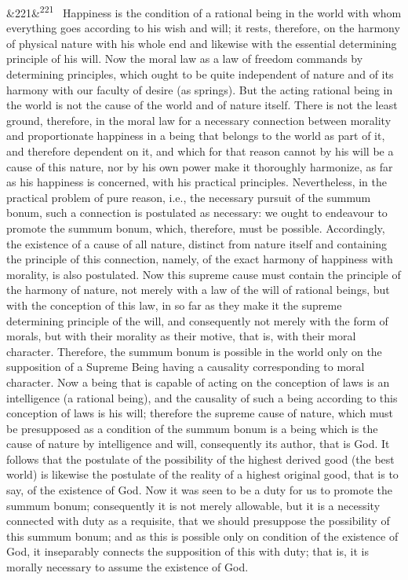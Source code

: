 \documentclass[12pt]{article}
\newcommand{\para}[1][]{\par\noindent\ifx&#1&\else\textsuperscript{\footnotesize #1}~\fi}
\begin{document}
\para[221] Happiness is the condition of a rational being in the world with whom everything goes according to his wish and will; it rests, therefore, on the harmony of physical nature with his whole end and likewise with the essential determining principle of his will. Now the moral law as a law of freedom commands by determining principles, which ought to be quite independent of nature and of its harmony with our faculty of desire (as springs). But the acting rational being in the world is not the cause of the world and of nature itself. There is not the least ground, therefore, in the moral law for a necessary connection between morality and proportionate happiness in a being that belongs to the world as part of it, and therefore dependent on it, and which for that reason cannot by his will be a cause of this nature, nor by his own power make it thoroughly harmonize, as far as his happiness is concerned, with his practical principles. Nevertheless, in the practical problem of pure reason, i.e., the necessary pursuit of the summum bonum, such a connection is postulated as necessary: we ought to endeavour to promote the summum bonum, which, therefore, must be possible. Accordingly, the existence of a cause of all nature, distinct from nature itself and containing the principle of this connection, namely, of the exact harmony of happiness with morality, is also postulated. Now this supreme cause must contain the principle of the harmony of nature, not merely with a law of the will of rational beings, but with the conception of this law, in so far as they make it the supreme determining principle of the will, and consequently not merely with the form of morals, but with their morality as their motive, that is, with their moral character. Therefore, the summum bonum is possible in the world only on the supposition of a Supreme Being having a causality corresponding to moral character. Now a being that is capable of acting on the conception of laws is an intelligence (a rational being), and the causality of such a being according to this conception of laws is his will; therefore the supreme cause of nature, which must be presupposed as a condition of the summum bonum is a being which is the cause of nature by intelligence and will, consequently its author, that is God. It follows that the postulate of the possibility of the highest derived good (the best world) is likewise the postulate of the reality of a highest original good, that is to say, of the existence of God. Now it was seen to be a duty for us to promote the summum bonum; consequently it is not merely allowable, but it is a necessity connected with duty as a requisite, that we should presuppose the possibility of this summum bonum; and as this is possible only on condition of the existence of God, it inseparably connects the supposition of this with duty; that is, it is morally necessary to assume the existence of God.
\end{document}
